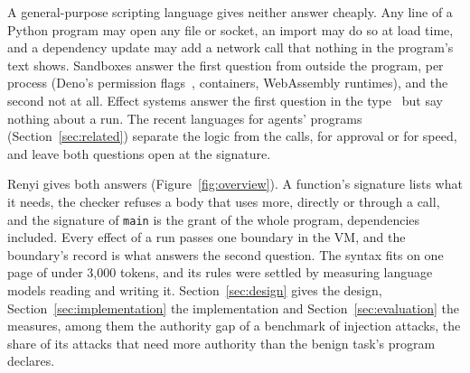 \documentclass[11pt]{article}
\begin{document}
A general-purpose scripting language gives neither answer cheaply. Any
line of a Python program may open any file or socket, an import may do
so at load time, and a dependency update may add a network call that
nothing in the program's text shows. Sandboxes answer the first
question from outside the program, per process (Deno's permission
flags~\citep{deno}, containers, WebAssembly runtimes), and the second
not at all. Effect systems answer the first question in the
type~\citep{leijen2014koka,brachthauser2020effekt} but say nothing
about a run. The recent languages for agents' programs
(Section~\ref{sec:related}) separate the logic from the calls, for
approval or for speed, and leave both questions open at the signature.

Renyi gives both answers (Figure~\ref{fig:overview}). A function's
signature lists what it needs, the checker refuses a body that uses
more, directly or through a call, and the signature of \texttt{main} is
the grant of the whole program, dependencies included. Every effect of
a run passes one boundary in the VM, and the boundary's record is what
answers the second question. The syntax fits on one page of under 3,000
tokens, and its rules were settled by measuring language models reading
and writing it. Section~\ref{sec:design} gives the design,
Section~\ref{sec:implementation} the implementation and
Section~\ref{sec:evaluation} the measures, among them the authority gap
of a benchmark of injection attacks, the share of its attacks that need
more authority than the benign task's program declares.
\end{document}

